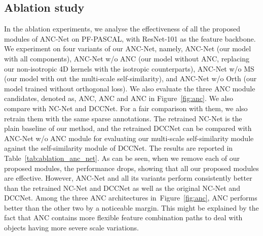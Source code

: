 \documentclass[10pt,twocolumn,letterpaper]{article}
\begin{document}
\subsection{Ablation study}
In the ablation experiments, we analyse the effectiveness of all the proposed modules of ANC-Net on PF-PASCAL, with ResNet-101 as the feature backbone.
We experiment on four variants of our ANC-Net, namely, ANC-Net (our model with all components), ANC-Net w/o ANC (our model without ANC, \ie replacing our non-isotropic 4D kernels with the isotropic counterparts), ANC-Net w/o MS (our model with out the multi-scale self-similarity), and ANC-Net w/o Orth (our model trained without orthogonal loss). We also evaluate the three ANC module candidates, denoted as, ANC, ANC and ANC in  Figure~\ref{fig:anc}. 
We also compare with NC-Net and DCCNet. 
For a fair comparison with them, we also retrain them with the same sparse annotations.
The retrained NC-Net is the plain baseline of our method, and the retrained DCCNet can be compared with ANC-Net w/o ANC module for evaluating our multi-scale self-similarity module against the self-similarity module of DCCNet. 
The results are reported in Table~\ref{tab:ablation_anc_net}.
As can be seen, when we remove each of our proposed modules, the performance drops, showing that all our proposed modules are effective.
However, ANC-Net and all its variants perform consistently better than the retrained NC-Net and DCCNet as well as the original NC-Net and DCCNet. Among the three ANC architectures in~Figure~\ref{fig:anc},
ANC performs better than the other two by a noticeable margin.
This might be explained by the fact that ANC contains more flexible feature combination paths to deal with objects having more severe scale variations.


\begin{table}[htb]
\centering
\caption{\textbf{Ablation study experimental results.}}
\label{tab:ablation_anc_net}
\end{table}
\end{document}
